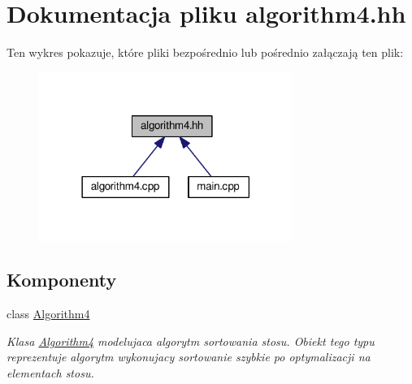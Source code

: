 \hypertarget{algorithm4_8hh}{\section{Dokumentacja pliku algorithm4.\-hh}
\label{algorithm4_8hh}
}
Ten wykres pokazuje, które pliki bezpośrednio lub pośrednio załączają ten plik\-:\nopagebreak
\begin{figure}[H]
\begin{center}
\leavevmode
\includegraphics[width=234pt]{algorithm4_8hh__dep__incl}
\end{center}
\end{figure}
\subsection*{Komponenty}
\begin{DoxyCompactItemize}
\item 
class \hyperlink{class_algorithm4}{Algorithm4}
\begin{DoxyCompactList}\small\item\em Klasa \hyperlink{class_algorithm4}{Algorithm4} modelujaca algorytm sortowania stosu. Obiekt tego typu reprezentuje algorytm wykonujacy sortowanie szybkie po optymalizacji na elementach stosu. \end{DoxyCompactList}\end{DoxyCompactItemize}
